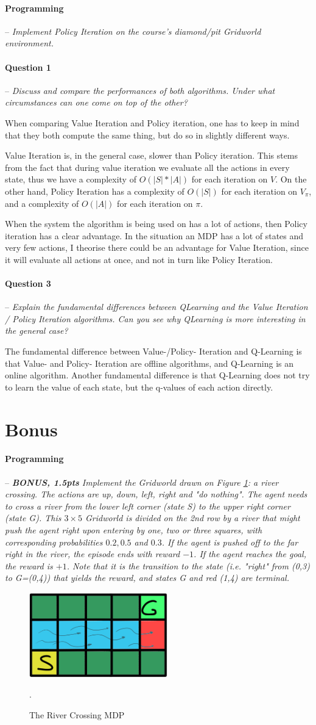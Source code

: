 \documentclass[a4paper]{article}
\newcommand{\question}[2]{
\paragraph{Question #1} -- \textit{#2}

}
\newcommand{\programming}[1]{
\paragraph{Programming} -- \textit{#1}

}
\begin{document}
		\programming{Implement Policy Iteration on the course's diamond/pit Gridworld environment.}

		\question{1}{Discuss and compare the performances of both algorithms. 
				Under what circumstances can one come on top of the other?}
			When comparing Value Iteration and Policy iteration, one has to keep in mind that they both compute the same thing, but do so in slightly different ways.

			Value Iteration is, in the general case, slower than Policy iteration.
			This stems from the fact that during value iteration we evaluate all the actions in every state, thus we have a complexity of $O(|S| * |A|)$ for each iteration on $V$.
			On the other hand, Policy Iteration has a complexity of $O(|S|)$ for each iteration on $V_{\pi}$, and a complexity of $O(|A|)$ for each iteration on $\pi$.

			When the system the algorithm is being used on has a lot of actions, then Policy iteration has a clear advantage.
			In the situation an MDP has a lot of states and very few actions, I theorise there could be an advantage for Value Iteration, since it will evaluate all actions at once, and not in turn like Policy Iteration.

		\question{3}{Explain the fundamental differences between QLearning and the Value Iteration / Policy Iteration algorithms. 
				Can you see why QLearning is more interesting in the general case?}
			The fundamental difference between Value-/Policy- Iteration and Q-Learning is that Value- and Policy- Iteration are offline algorithms, and Q-Learning is an online algorithm.
			Another fundamental difference is that Q-Learning does not try to learn the value of each state, but the q-values of each action directly.

	\section{Bonus}
		\programming{\textbf{BONUS, 1.5pts} Implement the Gridworld drawn on Figure \ref{fig:river_crossing}: a river crossing. 
				The actions are up, down, left, right and "do nothing". 
				The agent needs to cross a river from the lower left corner (state S) to the upper right corner (state G). 
				This $3\times 5$ Gridworld is divided on the 2nd row by a river that might push the agent right upon entering by one, two or three squares, with corresponding probabilities $0.2, 0.5$ and $0.3$. 
				If the agent is pushed off to the far right in the river, the episode ends with reward $-1$. 
				If the agent reaches the goal, the reward is $+1$. 
				Note that it is the transition to the state (i.e. "right" from (0,3) to G=(0,4)) that yields the reward, and states G and red (1,4) are terminal.}

		\begin{figure}[H]
			\centering
			\includegraphics[width=6cm]{plots/river.png}
			\caption{The River Crossing MDP}.
			\label{fig:river_crossing}
		\end{figure}{}


	\printbibliography
\end{document}
